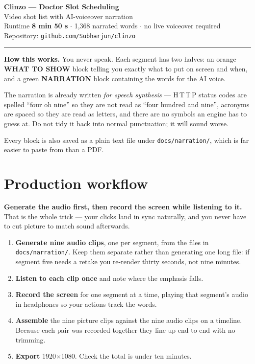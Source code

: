 \documentclass[11pt,a4paper]{article}
\begin{document}
\begin{center}
  {\LARGE\bfseries Clinzo --- Doctor Slot Scheduling}\\[5pt]
  {\Large\color{soft} Video shot list with AI-voiceover narration}\\[10pt]
  {\small Runtime \textbf{8 min 50 s} $\cdot$ 1{,}368 narrated words $\cdot$
   no live voiceover required\\
   Repository: \texttt{github.com/Subharjun/clinzo}}
\end{center}

\vspace{8pt}\hrule\vspace{12pt}

\begin{note}
\textbf{How this works.} You never speak. Each segment has two halves: an orange
\textbf{WHAT TO SHOW} block telling you exactly what to put on screen and when,
and a green \textbf{NARRATION} block containing the words for the AI voice.

The narration is already written \emph{for speech synthesis} --- H\,T\,T\,P
status codes are spelled ``four oh nine'' so they are not read as ``four
hundred and nine'', acronyms are spaced so they are read as letters, and there
are no symbols an engine has to guess at. Do not tidy it back into normal
punctuation; it will sound worse.

Every block is also saved as a plain text file under
\texttt{docs/narration/}, which is far easier to paste from than a PDF.
\end{note}

\section{Production workflow}

\textbf{Generate the audio first, then record the screen while listening to it.}
That is the whole trick --- your clicks land in sync naturally, and you never
have to cut picture to match sound afterwards.

\begin{enumerate}[leftmargin=*,itemsep=3pt]
  \item \textbf{Generate nine audio clips}, one per segment, from the files in
        \texttt{docs/narration/}. Keep them separate rather than generating one
        long file: if segment five needs a retake you re-render thirty seconds,
        not nine minutes.
  \item \textbf{Listen to each clip once} and note where the emphasis falls.
  \item \textbf{Record the screen} for one segment at a time, playing that
        segment's audio in headphones so your actions track the words.
  \item \textbf{Assemble} the nine picture clips against the nine audio clips on
        a timeline. Because each pair was recorded together they line up
        end to end with no trimming.
  \item \textbf{Export} 1920$\times$1080. Check the total is under ten minutes.
\end{enumerate}
\end{document}

